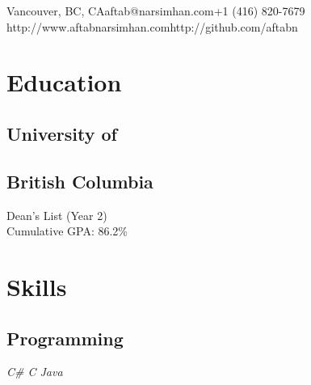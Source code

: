 \documentclass[]{aftab-resume}
\begin{document}
       {Vancouver, BC, CA}{aftab@narsimhan.com}{+1 (416) 820-7679}
       {http://www.aftabnarsimhan.com}{http://github.com/aftabn}
       

%
%

\begin{minipage}[t]{0.33\textwidth} 


\section{Education}
\vspace{0.15cm}

\subsection{University of}
\subsection{British Columbia}
\vspace{0.05cm}
\vspace{0.05cm}
\vspace{0.05cm}
\textbullet{} Dean's List (Year 2) \\
\textbullet{} Cumulative GPA: 86.2\%
\vspace{0.075cm}

\vspace{0.825cm}


\section{Skills}
\vspace{0.15cm}

\subsection{Programming}
\vspace{0.01cm}

\it{\textbullet{} C\# \textbullet{} C \textbullet{} Java \\ }
\vspace{0.05cm}


\end{minipage}
\end{document}

